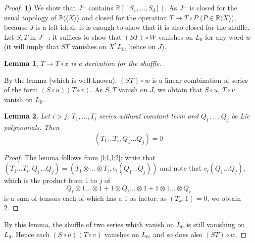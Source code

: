 \documentclass[a4paper,12pt]{article}
\newtheorem{lemma}{Lemma}
\newcommand{\R}{\mathbb{R}}
\newcommand{\Rx}{\R\langle X\rangle}
\newcommand{\Rxx}{\R\langle\langle X\rangle\rangle}
\begin{document}
\begin{proof}
	\textbf{1)} We show that $J^\perp$ contains $\R[[S_1,\dotsc,S_d]]$.
	As $J^\perp$ is closed for the usual topology of $\Rxx$ and closed for the operation $T \rightarrow T \circ P$ ($P \in \Rx$), because $J$ is a left ideal, it is enough to show that it is also closed for the shuffle. Let ${S}, {T}$ in ${J}^{\perp}$ : it suffices to show that $({ST}) \circ {W}$ vanishes on ${L}_0$ for any word ${w}$ (it will imply that ${ST}$ vanishes on ${X}^* L_0$, hence on ${J}$).
	
	\begin{lemma} \label{l:3}
		$T \rightarrow T \circ x$ is a derivation for the shuffle.
	\end{lemma}

	By the lemma (which is well-known), $({ST}) \circ {w}$ is a linear combination of series of the form $(S \circ u)(T \circ v)$. As $S, T$ vanish on $J$, we obtain that $S\circ u$, $T\circ v$ vanish on ${L}_0$.
	
	\begin{lemma} \label{l:4}
		Let $i > j$, $T_1, \ldots, T_i$ series without constant term and $Q_1, \ldots, Q_j$ be	Lie polynomials. Then
		\begin{equation*}
			\left(T_1 \ldots T_i, Q_1 \ldots Q_j\right)=0
		\end{equation*}
	\end{lemma}

	\begin{proof}
		The lemma follows from \cref{l:1,l:2}: write that $\left({T}_1 \ldots {T}_i,Q_1 \ldots Q_j\right)=\left(T_1 \otimes \ldots \otimes T_i, c_i\left(Q_1 \ldots Q_j\right)\right)$ and note that $c_i\left(Q_1 \ldots Q_j\right)$, which is the product from $1$ to $j$ of
		\begin{equation*}
			{Q}_{\ell} \otimes 1 \ldots \otimes 1+1 \otimes {Q}_{\ell} \ldots \otimes 1+1 \otimes 1 \ldots \otimes {Q}_{\ell}
		\end{equation*}
		is a sum of tensors each of which has a 1 as factor; as $\left(T_k, 1\right)=0$, we obtain \cref{l:4}.
	\end{proof}

	By this lemma, the shuffle of two series which vanish on ${L}_0$ is still vanishing on ${L}_0$. Hence each $({S} \circ {u})({T} \circ {v})$ vanishes on ${L}_0$, and so does also $(ST) \circ w$.
	
	\bigskip	
	

\end{proof}
\end{document}
